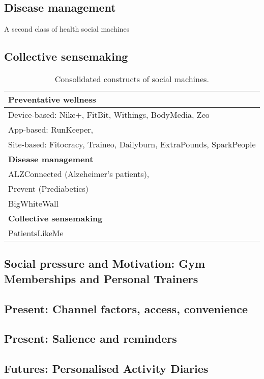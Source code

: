 \documentclass{sig-alternate}
\begin{document}
\subsection{Disease management}

A second class of health social machines 

\subsection{Collective sensemaking}





\begin{table}[htb]
\begin{center}
\begin{tabular}{|p{8cm}|}
\hline
{\bf Preventative wellness} \\
\hline
Device-based: Nike+, FitBit, Withings, BodyMedia, Zeo\\
App-based: RunKeeper, \\
Site-based: Fitocracy, Traineo, Dailyburn, ExtraPounds, SparkPeople  \\
\hline
{\bf Disease management} \\
\hline
ALZConnected (Alzeheimer's patients),  \\
Prevent (Prediabetics) \\
BigWhiteWall \\
\hline
{\bf Collective sensemaking} \\
\hline
PatientsLikeMe \\
\end{tabular}
\end{center}
\caption{Consolidated constructs of social machines.} \label{table:constructs}
\end{table}

\subsection{Social pressure and Motivation: Gym Memberships and Personal Trainers}

\subsection{Present: Channel factors, access, convenience}
\subsection{Present: Salience and reminders}
\subsection{Futures: Personalised Activity Diaries}
\end{document}
